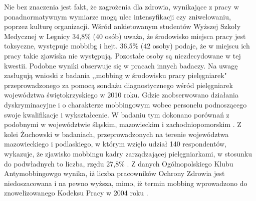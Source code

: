 \documentclass[a4paper,12pt,twoside,openright]{mwrep}
\begin{document}
Nie bez znaczenia jest fakt, że zagrożenia  dla zdrowia, wynikające z pracy w ponadnormatywnym wymiarze mogą ulec intensyfikacji czy zniwelowaniu, poprzez kulturę organizacji. Wśród ankietowanym studentów Wyższej Szkoły Medycznej w Legnicy 34,8\% (40 osób) uważa, że środowisko miejsca pracy jest toksyczne, występuje mobbibg i hejt. 36,5\% (42 osoby) podaje, że w miejscu ich pracy takie zjawiska nie występują. Pozostałe osoby są niezdecydowane w tej kwestii.  Podobne wyniki obserwuje się w pracach innych badaczy. Na uwagę zasługują wnioski z badania ,,mobbing w środowisku pracy pielęgniarek" przeprowadzonego za pomocą sondażu diagnostycznego wśród pielęgniarek województwa świętokrzyskiego w 2010 roku. Gdzie zaobserwowano działania dyskryminacyjne i o charakterze mobbingowym wobec personelu podnoszącego swoje kwalifikacje i wykształcenie. W badaniu tym dokonano porównań z podobnymi w województwie śląskim, mazowieckim i zachodniopomorskim \cite{mobbing}. Z kolei Żuchowski w badaniach, przeprowadzonych na terenie województwa mazowieckiego i podlaskiego, w którym wzięło udział 140 respondentów, wykazuje, że zjawisko mobbingu kadry zarządzającej pielęgniarkami, w stosunku do podwładnych to liczba, rzędu 27,8\% \cite{zuchowski}. Z danych Ogólnopolskiego Klubu Antymobbingowgo wynika, iż liczba pracowników Ochrony Zdrowia jest niedoszacowana i na pewno wyższa\cite{grabowski}, mimo, iż termin mobbing wprowadzono do znowelizowanego Kodeksu Pracy w 2004 roku \cite{kodeks}.
\end{document}
